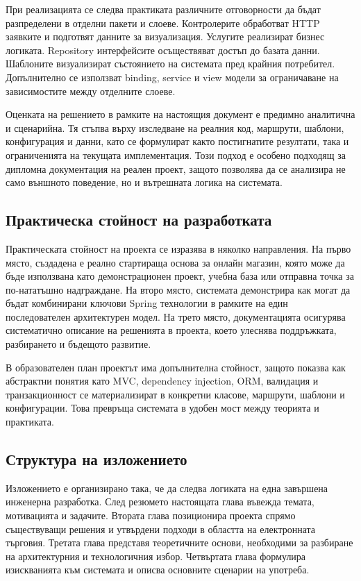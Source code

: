 При реализацията се следва практиката различните отговорности да бъдат разпределени в отделни пакети и слоеве. Контролерите обработват HTTP заявките и подготвят данните за визуализация. Услугите реализират бизнес логиката. Repository интерфейсите осъществяват достъп до базата данни. Шаблоните визуализират състоянието на системата пред крайния потребител. Допълнително се използват binding, service и view модели за ограничаване на зависимостите между отделните слоеве.

Оценката на решението в рамките на настоящия документ е предимно аналитична и сценарийна. Тя стъпва върху изследване на реалния код, маршрути, шаблони, конфигурация и данни, като се формулират както постигнатите резултати, така и ограниченията на текущата имплементация. Този подход е особено подходящ за дипломна документация на реален проект, защото позволява да се анализира не само външното поведение, но и вътрешната логика на системата.

\subsection{Практическа стойност на разработката}

Практическата стойност на проекта се изразява в няколко направления. На първо място, създадена е реално стартираща основа за онлайн магазин, която може да бъде използвана като демонстрационен проект, учебна база или отправна точка за по-нататъшно надграждане. На второ място, системата демонстрира как могат да бъдат комбинирани ключови Spring технологии в рамките на един последователен архитектурен модел. На трето място, документацията осигурява систематично описание на решенията в проекта, което улеснява поддръжката, разбирането и бъдещото развитие.

В образователен план проектът има допълнителна стойност, защото показва как абстрактни понятия като MVC, dependency injection, ORM, валидация и транзакционност се материализират в конкретни класове, маршрути, шаблони и конфигурации. Това превръща системата в удобен мост между теорията и практиката.

\subsection{Структура на изложението}

Изложението е организирано така, че да следва логиката на една завършена инженерна разработка. След резюмето настоящата глава въвежда темата, мотивацията и задачите. Втората глава позиционира проекта спрямо съществуващи решения и утвърдени подходи в областта на електронната търговия. Третата глава представя теоретичните основи, необходими за разбиране на архитектурния и технологичния избор. Четвъртата глава формулира изискванията към системата и описва основните сценарии на употреба.

